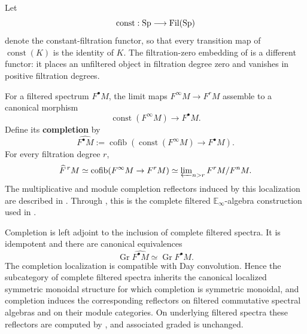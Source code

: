 \begin{construction}
\label{con:filtered-spectrum-completion}
Let
\[
    \operatorname{const}:
    \operatorname{Sp}\longrightarrow\operatorname{Fil}(\operatorname{Sp})
\]
denote the constant-filtration functor, so that every transition map of
\(\operatorname{const}(K)\) is the identity of \(K\). The filtration-zero
embedding of  is a different functor: it
places an unfiltered object in filtration degree zero and vanishes in positive
filtration degrees.

For a filtered spectrum \(F^\bullet M\), the limit maps
\(F^\infty M\to F^rM\) assemble to a canonical morphism
\[
    \operatorname{const}(F^\infty M)
    \longrightarrow
    F^\bullet M.
\]
Define its \textbf{completion} by
\[
    \widehat{F^\bullet M}
    :=
    \operatorname{cofib}
    \left(
        \operatorname{const}(F^\infty M)
        \longrightarrow
        F^\bullet M
    \right).
\]
For every filtration degree \(r\),
\[
    \widehat F^{\,r}M
    \simeq
    \operatorname{cofib}(F^\infty M\to F^rM)
    \simeq
    \varprojlim\nolimits_{n>r}F^rM/F^nM.
\]
The multiplicative and module completion reflectors induced by this
localization are described in
. Through
, this is the complete filtered
\(\mathbb E_\infty\)-algebra construction used in
\cite[Section~2]{AntieauFiltrationsCohomologyIII2025}.
\end{construction}

\begin{proposition}
\label{prop:filtered-completion-reflector}
Completion is left adjoint to the inclusion of complete filtered spectra. It
is idempotent and there are canonical equivalences
\[
    \operatorname{Gr}\widehat{F^\bullet M}
    \simeq
    \operatorname{Gr}F^\bullet M.
\]
The completion localization is compatible with Day convolution. Hence the
subcategory of complete filtered spectra inherits the canonical localized
symmetric monoidal structure for which completion is symmetric monoidal, and
completion induces the corresponding reflectors on filtered commutative
spectral algebras and on their module categories. On underlying filtered
spectra these reflectors are computed by
, and associated graded is unchanged.
\end{proposition}

